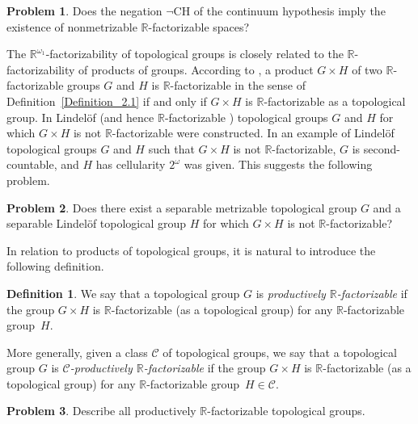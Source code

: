 \documentclass[a4paper,12pt]{amsart}
\theoremstyle{definition}
\newtheorem{definition}{Definition}[section]
\newtheorem{problem}{Problem}[section]
\theoremstyle{remark}
\begin{document}
\begin{problem}
Does the negation $\lnot \mathrm{CH}$ of the continuum hypothesis  imply the existence of  nonmetrizable 
$\mathbb R$-factorizable spaces? 
\end{problem}

The $\mathbb R^{\omega_1}$-factorizability of topological groups is closely related to the $\mathbb 
R$-factorizability of products of groups. According to \cite{R-S_2025}, a product $G\times H$ of two 
$\mathbb R$-factorizable groups $G$ and $H$ is $\mathbb R$-factorizable in the sense of 
Definition~\ref{Definition_2.1} 
if and only if $G\times H$ is $\mathbb R$-factorizable as a topological group. In 
\cite{S_2022, S_2023, S_2025, R_2024} Lindel\"of (and hence $\mathbb 
R$-factorizable \cite[Assertion~1.1]{T_1991}) topological groups $G$ and $H$ for which $G\times H$ is not $\mathbb 
R$-factorizable were constructed. In \cite{S_2025} an example of Lindel\"of topological groups $G$ and 
$H$ such that $G\times H$ is not $\mathbb R$-factorizable, $G$ is second-countable, and $H$ has cellularity 
$2^\omega$ was given. This suggests the following problem.

\begin{problem}
Does there exist a separable metrizable topological group $G$ and a separable Lindel\"of topological group $H$ 
for which $G\times H$ is not $\mathbb R$-factorizable? 
\end{problem} 

In relation to products of topological groups, it is natural to introduce the following definition. 

\begin{definition}
We say that a topological group $G$ is \emph{productively $\mathbb R$-fac\-tor\-iz\-able} if the group $G\times H$ is 
$\mathbb R$-factorizable (as a topological group) for any $\mathbb R$-factorizable group~$H$. 

More generally, given a class $\mathscr C$ of topological groups, we say that a topological group $G$ is 
\emph{$\mathscr C$-productively $\mathbb R$-factorizable} if the group $G\times H$ is $\mathbb R$-factorizable 
(as a topological group) for any $\mathbb R$-factorizable group~$H\in\mathscr C$. 
\end{definition}

\begin{problem}
Describe all productively $\mathbb R$-factorizable topological  groups. 
\end{problem}
\end{document}
